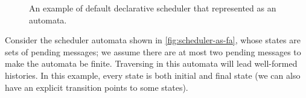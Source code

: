 \begin{figure}[h!]
    \caption{An example of default declarative scheduler that represented as an automata.}
    \label{fig:scheduler-as-fa}
\end{figure}

\begin{example} Consider the scheduler automata shown in \autoref{fig:scheduler-as-fa}, whose states are sets of pending messages; we assume there are at most two pending messages to make the automata be finite. Traversing in this automata will lead well-formed histories. In this example, every state is both initial and final state (we can also have an explicit  transition points to some states).
\end{example}

